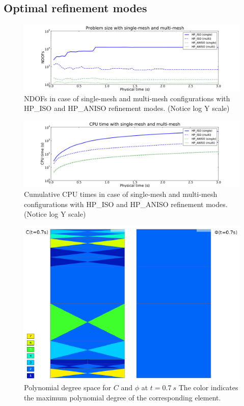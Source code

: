 \subsection{Optimal refinement modes}

\begin{figure}[!ht]
  \begin{centering}
  \includegraphics[width=\columnwidth]{singlemulti_dof}
  \caption{\label{fig:singlemultidof} NDOFs in case 
  of single-mesh and multi-mesh configurations with HP\_ISO
  and HP\_ANISO refinement modes. (Notice log Y scale)}
  \end{centering}
\end{figure}

\begin{figure}[!ht]
  \begin{centering}
  \includegraphics[width=\columnwidth]{singlemulti_cpu}
  \caption{\label{fig:singlemulticpu} Cumulative CPU times in case
  of single-mesh and multi-mesh configurations with HP\_ISO
  and HP\_ANISO refinement modes. (Notice log Y scale)}
  \end{centering}
\end{figure}

\begin{figure}[!ht]
  \begin{centering}
  \includegraphics[width=.75\columnwidth]{poly}
  \caption{\label{fig:poly} Polynomial degree space
  for $C$ and $\phi$ at $t=0.7\ s$ The color indicates
  the maximum polynomial degree of the corresponding element.}
  \end{centering}
\end{figure}


